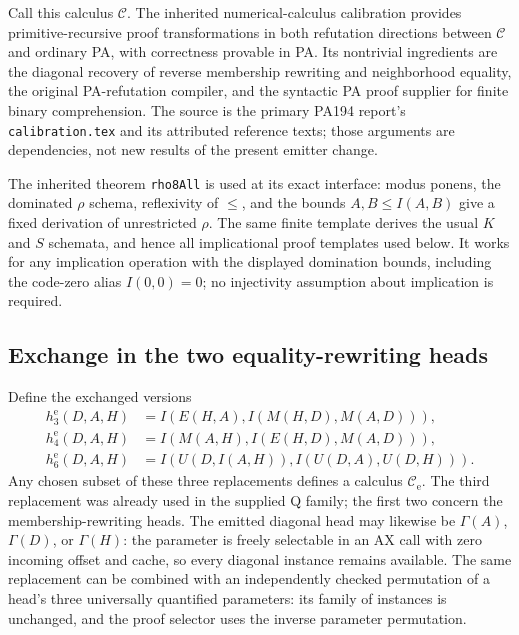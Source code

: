 Call this calculus $\mathcal C$.  The inherited numerical-calculus
calibration provides primitive-recursive proof transformations in both
refutation directions between $\mathcal C$ and ordinary PA, with correctness
provable in PA.  Its nontrivial ingredients are the diagonal recovery of
reverse membership rewriting and neighborhood equality, the original
PA-refutation compiler, and the syntactic PA proof supplier for finite binary
comprehension.  The source is the primary PA194 report's
\texttt{calibration.tex} and its attributed reference texts; those arguments
are dependencies, not new results of the present emitter change.

The inherited theorem \texttt{rho8All} is used at its exact interface:
modus ponens, the dominated $\rho$ schema, reflexivity of $\leq$, and the
bounds $A,B\leq I(A,B)$ give a fixed derivation of unrestricted $\rho$.
The same finite template derives the usual $K$ and $S$ schemata, and hence
all implicational proof templates used below.  It works for any implication
operation with the displayed domination bounds, including the code-zero
alias $I(0,0)=0$; no injectivity assumption about implication is required.

\subsection{Exchange in the two equality-rewriting heads}

Define the exchanged versions
\begin{align*}
 h_3^{\mathrm e}(D,A,H)
   &=I(E(H,A),I(M(H,D),M(A,D))),\\
 h_4^{\mathrm e}(D,A,H)
   &=I(M(A,H),I(E(H,D),M(A,D))),\\
 h_6^{\mathrm e}(D,A,H)
   &=I(U(D,I(A,H)),I(U(D,A),U(D,H))).
\end{align*}
Any chosen subset of these three replacements defines a calculus
$\mathcal C_{\mathrm e}$.  The third replacement was already used in the
supplied Q family; the first two concern the membership-rewriting heads.
The emitted diagonal head may likewise be $\Gamma(A)$, $\Gamma(D)$, or
$\Gamma(H)$: the parameter is freely selectable in an AX call with zero
incoming offset and cache, so every diagonal instance remains available.
The same replacement can be combined with an independently checked
permutation of a head's three universally quantified parameters: its family
of instances is unchanged, and the proof selector uses the inverse
parameter permutation.

